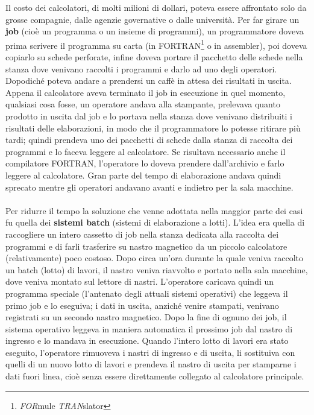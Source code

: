 Il costo dei calcolatori, di molti milioni di dollari, poteva essere affrontato solo da grosse compagnie, dalle agenzie governative o dalle università. Per far girare un \textbf{job} (cioè un programma o un insieme di programmi), un programmatore doveva prima scrivere il
programma su carta (in FORTRAN\footnote{\textit{FOR}mule \textit{TRAN}slator} o in assembler), poi doveva copiarlo su schede perforate, infine doveva portare il pacchetto delle schede nella stanza dove venivano raccolti i programmi e darlo ad uno degli operatori. Dopodiché poteva andare a prendersi un caffè in attesa dei risultati in uscita. Appena il calcolatore aveva terminato il job in esecuzione in quel momento, qualsiasi cosa fosse, un operatore andava alla stampante, prelevava quanto prodotto in uscita dal job e lo portava nella stanza dove venivano distribuiti i risultati delle elaborazioni, in modo che il programmatore lo potesse ritirare più tardi; quindi prendeva uno dei pacchetti di schede dalla stanza di raccolta dei programmi e lo faceva leggere al calcolatore.  Se risultava necessario anche il compilatore FORTRAN, l'operatore lo doveva prendere dall'archivio e farlo leggere al calcolatore. Gran parte del tempo di elaborazione andava quindi sprecato mentre gli operatori andavano avanti e indietro per la sala macchine.

\paragraph*{}
Per ridurre il tempo la soluzione che venne adottata nella maggior parte dei casi fu quella dei \textbf{sistemi batch} (sistemi di elaborazione a lotti). L'idea era quella di raccogliere un intero cassetto di job nella stanza dedicata alla raccolta dei programmi e di farli trasferire su nastro magnetico da un piccolo calcolatore (relativamente) poco costoso.
Dopo circa un'ora durante la quale veniva raccolto un batch (lotto) di lavori, il nastro veniva riavvolto e portato nella sala macchine, dove veniva montato sul lettore di nastri. L'operatore caricava quindi un programma speciale (l'antenato degli attuali sistemi operativi) che leggeva il primo job e lo eseguiva; i dati in uscita, anziché venire stampati, venivano registrati su un secondo nastro magnetico. Dopo la fine di ognuno dei job, il sistema operativo leggeva in maniera automatica il prossimo job dal nastro di ingresso e lo mandava in esecuzione. Quando l'intero lotto di lavori era stato eseguito, l'operatore rimuoveva i nastri di ingresso e di uscita, li sostituiva con quelli di un nuovo lotto di lavori e prendeva il nastro di uscita per stamparne i dati fuori linea, cioè senza essere direttamente collegato al calcolatore principale.

